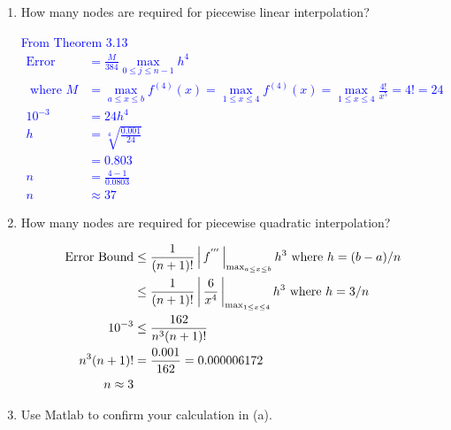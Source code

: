 \documentclass[10pt,a4paper]{report}
\newcommand{\BLUE}[1]{\textcolor{blue}{#1}}
\begin{document}
\begin{enumerate}[label=(\alph*)]

	\item How many nodes are required for piecewise linear interpolation?
	
	\BLUE{From Theorem 3.13
	\begin{align*}
		\text{Error Bound} &= \frac{M}{384}\max_{0\le j\le n-1}h^4 \\
		\text{ where } M&=\max_{a\le x \le b}f^{(4)}(x) =\max_{1\le x \le 4}f^{(4)}(x) = \max_{1\le x \le 4} \frac{4!}{x^5}=4!=24 \\
		10^{-3} &= 24 h^4 \\
		h &= \sqrt[4]{\frac{0.001}{24}} \\
		&=0.803 \\
		n &= \frac{4-1}{0.0803} \\
		n &\approx 37
	\end{align*}
	}
	
	\item How many nodes are required for piecewise quadratic interpolation?
	
	\BLUE{\begin{align*}
		\text{Error Bound} &\le \frac{1}{(n+1)!}\left |\, f^{'''} \,\right |_{\max_{a\le x \le b}}h^3  \text{ where } h = (b-a)/n\\
		&\le \frac{1}{(n+1)!}\left |\, \frac{6}{x^4} \,\right |_{\max_{1\le x \le 4}}h^3 \text{ where } h = 3/n\\
		10^{-3} &\le \frac{162}{n^3(n+1)!} \\
		n^3(n+1)! &= \frac{0.001}{162} = 0.000006172 \\
		n \approx 3
	\end{align*}
	}
	
	\item Use Matlab to confirm your calculation in (a).

\end{enumerate}
\end{document}
